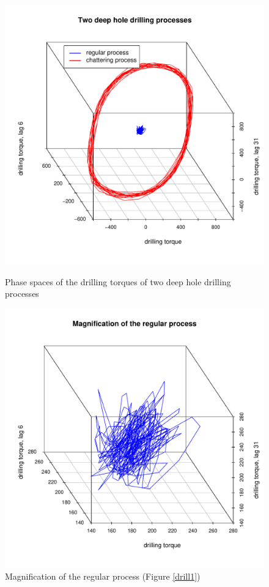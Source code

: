\begin{figure}[htb!]
\vspace*{-15mm}
\begin{center}\includegraphics[width=11.5cm]{drill1}
\vspace*{-10mm}\caption{Phase spaces of the drilling torques of two deep hole drilling processes\label{drill1}}
\vspace*{10mm}
\includegraphics[width=11.5cm]{drill2}\end{center}
\vspace*{-10mm}\caption{Magnification of the regular process (Figure \ref{drill1})\label{drill2}}
\end{figure}
\clearpage
